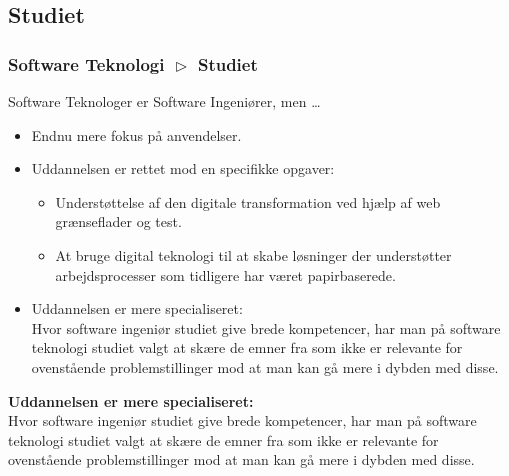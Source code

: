 \subsection{Studiet}
\begin{frame}[fragile]
  \frametitle{Software Teknologi $\vartriangleright$ Studiet}
  \vspace{1mm}
  Software Teknologer er Software Ingeniører, men \ldots
  \begin{itemize}
    \item Endnu mere fokus på anvendelser.
    \item Uddannelsen er rettet mod en specifikke opgaver:
      \begin{itemize}
        \item Understøttelse af den digitale transformation ved hjælp af web grænseflader og test.
        \item At bruge digital teknologi til at skabe løsninger der understøtter arbejdsprocesser som tidligere har været papirbaserede.
      \end{itemize}
    \pause
    \item Uddannelsen er mere specialiseret: \\
      Hvor software ingeniør studiet give brede kompetencer, har man på software teknologi studiet valgt at skære de emner fra som ikke er relevante for ovenstående problemstillinger mod at man kan gå mere i dybden med disse.
  \end{itemize}
  
  \pause
  \vspace{3mm}
  \textbf{Uddannelsen er mere specialiseret:} \\
  Hvor software ingeniør studiet give brede kompetencer, har man på software teknologi studiet valgt at skære de emner fra som ikke er relevante for ovenstående problemstillinger mod at man kan gå mere i dybden med disse.
\end{frame}

